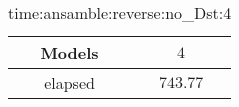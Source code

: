 \begin{table}[!ht]
	\centering
	\begin{tabular}{|c|c|}
		\hline
		Models & $4$ \\ \hline
		elapsed & $743.77$ \\ \hline
	\end{tabular}
	\caption{time:ansamble:reverse:no_Dst:4}
	\label{tab:time:ansamble:reverse:no_Dst:4}
\end{table}
